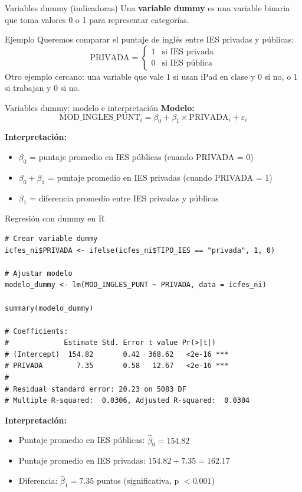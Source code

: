 \documentclass[aspectratio=169, 11pt]{beamer}
\begin{document}
\begin{frame}{Variables dummy (indicadoras)}
Una \textbf{variable dummy} es una variable binaria que toma valores 0 o 1 para representar categor\'ias.

\vspace{0.2cm}
\begin{exampleblock}{Ejemplo}
Queremos comparar el puntaje de ingl\'es entre IES privadas y p\'ublicas:
\[
\text{PRIVADA} = \begin{cases}
1 & \text{si IES privada} \\
0 & \text{si IES p\'ublica}
\end{cases}
\]
Otro ejemplo cercano: una variable que vale 1 si usan iPad en clase y 0 si no, o 1 si trabajan y 0 si no.
\end{exampleblock}
\end{frame}

\begin{frame}{Variables dummy: modelo e interpretaci\'on}
\textbf{Modelo:}
\[
\text{MOD\_INGLES\_PUNT}_i = \beta_0 + \beta_1 \times \text{PRIVADA}_i + \varepsilon_i
\]

\vspace{0.2cm}
\textbf{Interpretaci\'on:}
\begin{itemize}
  \item $\beta_0$ = puntaje promedio en IES p\'ublicas (cuando PRIVADA = 0)
  \item $\beta_0 + \beta_1$ = puntaje promedio en IES privadas (cuando PRIVADA = 1)
  \item $\beta_1$ = diferencia promedio entre IES privadas y p\'ublicas
\end{itemize}
\end{frame}

\begin{frame}[fragile]{Regresi\'on con dummy en R}
\begin{lstlisting}[basicstyle=\ttfamily\scriptsize]
# Crear variable dummy
icfes_ni$PRIVADA <- ifelse(icfes_ni$TIPO_IES == "privada", 1, 0)

# Ajustar modelo
modelo_dummy <- lm(MOD_INGLES_PUNT ~ PRIVADA, data = icfes_ni)

summary(modelo_dummy)

# Coefficients:
#             Estimate Std. Error t value Pr(>|t|)
# (Intercept)  154.82       0.42  368.62   <2e-16 ***
# PRIVADA        7.35       0.58   12.67   <2e-16 ***
#
# Residual standard error: 20.23 on 5083 DF
# Multiple R-squared:  0.0306, Adjusted R-squared:  0.0304
\end{lstlisting}

\vspace{0.2cm}
\textbf{Interpretación:}
\begin{itemize}
  \item Puntaje promedio en IES públicas: $\hat{\beta}_0 = 154.82$
  \item Puntaje promedio en IES privadas: $154.82 + 7.35 = 162.17$
  \item Diferencia: $\hat{\beta}_1 = 7.35$ puntos (significativa, p $< 0.001$)
\end{itemize}
\end{frame}
\end{document}
